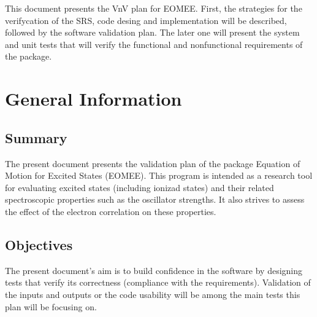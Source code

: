 \documentclass[12pt, titlepage]{article}
\begin{document}

\newpage


This document presents the VnV plan for EOMEE. First, the strategies for the 
verifycation of the SRS, code desing and implementation will be described, 
followed by the software validation plan. The later one will present the system 
and unit tests that will verify the functional and nonfunctional requirements 
of the package.

\section{General Information}

\subsection{Summary}

The present document presents the validation plan of the package Equation of 
Motion for Excited States (EOMEE). This program is intended as a research tool 
for evaluating excited states (including ionizad states) and their related 
spectroscopic properties such as the oscillator strengths. It also strives to 
assess the effect of the electron correlation on these properties.

\subsection{Objectives}

The present document's aim is to build confidence in the software by designing 
tests that verify its correctness (compliance with the requirements). 
Validation of the inputs and outputs or the 
code usability will be among the main tests this plan will be focusing on.
\end{document}
